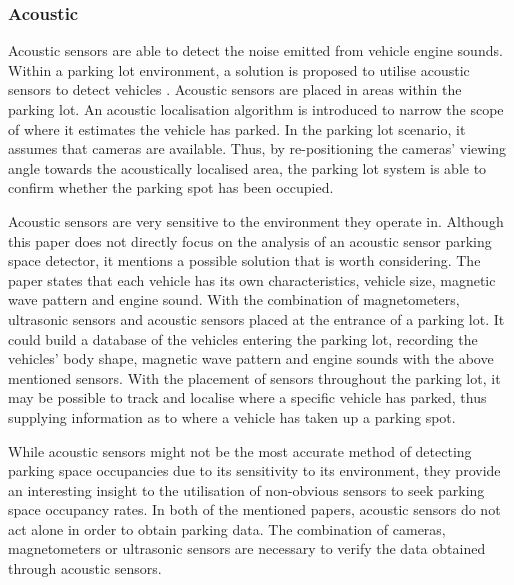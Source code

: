 \subsubsection*{Acoustic}
Acoustic sensors are able to detect the noise emitted from vehicle engine sounds. Within a parking lot environment, a solution is proposed to utilise acoustic sensors to detect vehicles \citep{Na2009AcousticSystem}. Acoustic sensors are placed in areas within the parking lot. An acoustic localisation algorithm is introduced to narrow the scope of where it estimates the vehicle has parked. In the parking lot scenario, it assumes that cameras are available. Thus, by re-positioning the cameras' viewing angle towards the acoustically localised area, the parking lot system is able to confirm whether the parking spot has been occupied. 

Acoustic sensors are very sensitive to the environment they operate in. Although this paper \citep{Lee2008IntelligentNetworks} does not directly focus on the analysis of an acoustic sensor parking space detector, it mentions a possible solution that is worth considering. The paper states that each vehicle has its own characteristics, vehicle size, magnetic wave pattern and engine sound. With the combination of magnetometers, ultrasonic sensors and acoustic sensors placed at the entrance of a parking lot. It could build a database of the vehicles entering the parking lot, recording the vehicles' body shape, magnetic wave pattern and engine sounds with the above mentioned sensors. With the placement of sensors throughout the parking lot, it may be possible to track and localise where a specific vehicle has parked, thus supplying information as to where a vehicle has taken up a parking spot.

While acoustic sensors might not be the most accurate method of detecting parking space occupancies due to its sensitivity to its environment, they provide an interesting insight to the utilisation of non-obvious sensors to seek parking space occupancy rates. In both of the mentioned papers, acoustic sensors do not act alone in order to obtain parking data. The combination of cameras, magnetometers or ultrasonic sensors are necessary to verify the data obtained through acoustic sensors. 